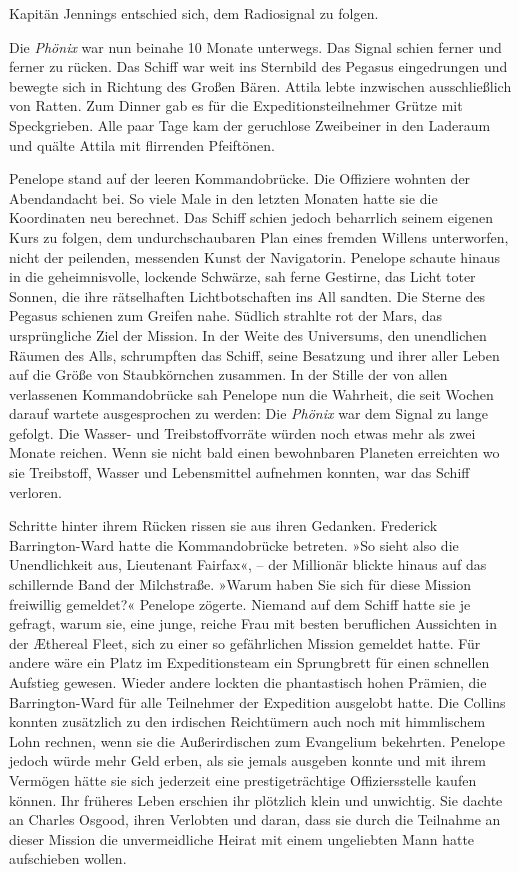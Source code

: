 Kapitän Jennings entschied sich, dem Radiosignal zu folgen.

\tb

Die \textit{Phönix} war nun beinahe 10 Monate unterwegs. Das Signal schien
ferner und ferner zu rücken. Das Schiff war weit ins Sternbild des
Pegasus eingedrungen und bewegte sich in Richtung des Großen Bären.
Attila lebte inzwischen ausschließlich von Ratten. Zum Dinner gab
es für die Expeditionsteilnehmer Grütze mit Speckgrieben. Alle paar
Tage kam der geruchlose Zweibeiner in den Laderaum und quälte
Attila mit flirrenden Pfeiftönen.

\tb

Penelope stand auf der leeren Kommandobrücke. Die Offiziere wohnten
der Abendandacht bei. So viele Male in den letzten Monaten hatte
sie die Koordinaten neu berechnet. Das Schiff schien jedoch
beharrlich seinem eigenen Kurs zu folgen, dem undurchschaubaren
Plan eines fremden Willens unterworfen, nicht der peilenden,
messenden Kunst der Navigatorin. Penelope schaute hinaus in die
geheimnisvolle, lockende Schwärze, sah ferne Gestirne, das Licht
toter Sonnen, die ihre rätselhaften Lichtbotschaften ins All
sandten. Die Sterne des Pegasus schienen zum Greifen nahe. Südlich
strahlte rot der Mars, das ursprüngliche Ziel der Mission. In der
Weite des Universums, den unendlichen Räumen des Alls, schrumpften
das Schiff, seine Besatzung und ihrer aller Leben auf die Größe von
Staubkörnchen zusammen. In der Stille der von allen verlassenen
Kommandobrücke sah Penelope nun die Wahrheit, die seit Wochen
darauf wartete ausgesprochen zu werden: Die \textit{Phönix} war dem Signal
zu lange gefolgt. Die Wasser- und Treibstoffvorräte würden noch
etwas mehr als zwei Monate reichen. Wenn sie nicht bald einen
bewohnbaren Planeten erreichten wo sie Treibstoff, Wasser und
Lebensmittel aufnehmen konnten, war das Schiff verloren.

\bigpar

Schritte hinter ihrem Rücken rissen sie aus ihren Gedanken.
Frederick Barrington-Ward hatte die Kommandobrücke betreten. »So
sieht also die Unendlichkeit aus, Lieutenant Fairfax«, – der
Millionär blickte hinaus auf das schillernde Band der Milchstraße.
»Warum haben Sie sich für diese Mission freiwillig gemeldet?«
Penelope zögerte. Niemand auf dem Schiff hatte sie je gefragt,
warum sie, eine junge, reiche Frau mit besten beruflichen
Aussichten in der Æthereal Fleet, sich zu einer so gefährlichen
Mission gemeldet hatte. Für andere wäre ein Platz im
Expeditionsteam ein Sprungbrett für einen schnellen Aufstieg
gewesen. Wieder andere lockten die phantastisch hohen Prämien, die
Barrington-Ward für alle Teilnehmer der Expedition ausgelobt hatte.
Die Collins konnten zusätzlich zu den irdischen Reichtümern auch
noch mit himmlischem Lohn rechnen, wenn sie die Außerirdischen zum
Evangelium bekehrten. Penelope jedoch würde mehr Geld erben, als
sie jemals ausgeben konnte und mit ihrem Vermögen hätte sie sich
jederzeit eine prestigeträchtige Offiziersstelle kaufen können. Ihr
früheres Leben erschien ihr plötzlich klein und unwichtig. Sie
dachte an Charles Osgood, ihren Verlobten und daran, dass sie durch
die Teilnahme an dieser Mission die unvermeidliche Heirat mit einem
ungeliebten Mann hatte aufschieben wollen.

